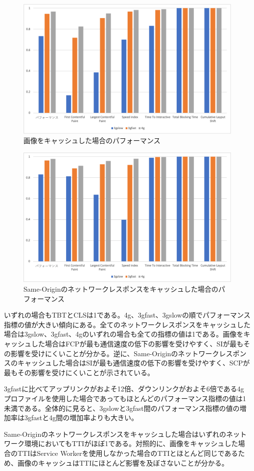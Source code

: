 \begin{figure}
  \centering
  \includegraphics[width=\textwidth]{images/service_worker_cache_images.png}
  \caption{画像をキャッシュした場合のパフォーマンス}\label{figure:画像をキャッシュした場合のパフォーマンス}
\end{figure}
\begin{figure}
  \centering
  \includegraphics[width=\textwidth]{images/service_worker_cache_same_origin.png}
  \caption{Same-Originのネットワークレスポンスをキャッシュした場合のパフォーマンス}\label{figure:Same-Originのネットワークレスポンスをキャッシュした場合のパフォーマンス}
\end{figure}
いずれの場合もTBTとCLSは1である。4g、3gfast、3gslowの順でパフォーマンス指標の値が大きい傾向にある。全てのネットワークレスポンスをキャッシュした場合は3gslow、3gfast、4gのいずれの場合も全ての指標の値は1である。画像をキャッシュした場合はFCPが最も通信速度の低下の影響を受けやすく、SIが最もその影響を受けにくいことが分かる。逆に、Same-Originのネットワークレスポンスのキャッシュした場合はSIが最も通信速度の低下の影響を受けやすく、SCPが最もその影響を受けにくいことが示されている。

3gfastに比べてアップリンクがおよそ12倍、ダウンリンクがおよそ6倍である4gプロファイルを使用した場合であってもほとんどのパフォーマンス指標の値は1未満である。全体的に見ると、3gslowと3gfast間のパフォーマンス指標の値の増加率は3gfastと4g間の増加率よりも大きい。

Same-Originのネットワークレスポンスをキャッシュした場合はいずれのネットワーク環境においてもTTIがほぼ1である。対照的に、画像をキャッシュした場合のTTIはService Workerを使用しなかった場合のTTIとほとんど同じであるため、画像のキャッシュはTTIにほとんど影響を及ぼさないことが分かる。